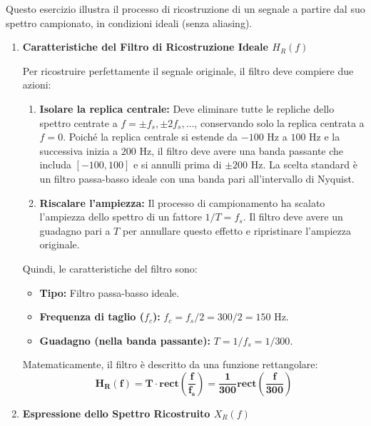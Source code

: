 
\begin{soluzione}{5}
    Questo esercizio illustra il processo di ricostruzione di un segnale a partire dal suo spettro campionato, in condizioni ideali (senza aliasing).

    \begin{enumerate}
        \item \textbf{Caratteristiche del Filtro di Ricostruzione Ideale $H_R(f)$}
        
        Per ricostruire perfettamente il segnale originale, il filtro deve compiere due azioni:
        \begin{enumerate}
            \item \textbf{Isolare la replica centrale:} Deve eliminare tutte le repliche dello spettro centrate a $f = \pm f_s, \pm 2f_s, \dots$, conservando solo la replica centrata a $f=0$. Poiché la replica centrale si estende da $-100$ Hz a $100$ Hz e la successiva inizia a $200$ Hz, il filtro deve avere una banda passante che includa $[-100, 100]$ e si annulli prima di $\pm 200$ Hz. La scelta standard è un filtro passa-basso ideale con una banda pari all'intervallo di Nyquist.
            \item \textbf{Riscalare l'ampiezza:} Il processo di campionamento ha scalato l'ampiezza dello spettro di un fattore $1/T = f_s$. Il filtro deve avere un guadagno pari a $T$ per annullare questo effetto e ripristinare l'ampiezza originale.
        \end{enumerate}
        
        Quindi, le caratteristiche del filtro sono:
        \begin{itemize}
            \item \textbf{Tipo:} Filtro passa-basso ideale.
            \item \textbf{Frequenza di taglio ($f_c$):} $f_c = f_s/2 = 300/2 = 150$ Hz.
            \item \textbf{Guadagno (nella banda passante):} $T = 1/f_s = 1/300$.
        \end{itemize}
        Matematicamente, il filtro è descritto da una funzione rettangolare:
        \[
            \mathbf{H_R(f) = T \cdot \text{rect}\left(\frac{f}{f_s}\right) = \frac{1}{300} \text{rect}\left(\frac{f}{300}\right)}
        \]

        \item \textbf{Espressione dello Spettro Ricostruito $X_R(f)$}
        

\end{enumerate}
\end{soluzione}
